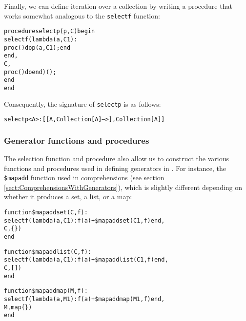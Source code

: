 

Finally, we can define iteration over a collection by writing a
procedure that works somewhat analogous to the {\tt selectf} function:

\begin{alltt}procedure selectp(p, C) begin
    selectf(lambda (a, C1) : 
                proc () do p(a, C1); end 
            end, 
            C,
            proc () do end)();
    end 
end
\end{alltt}

Consequently, the signature of {\tt selectp} is as follows:

\begin{alltt}  selectp<A>: [[A, Collection[A] -->], Collection[A]]\end{alltt}

\subsubsection{Generator functions and procedures}


The selection function and procedure also allow us to construct the
various functions and procedures used in defining generators in
\Cal. For instance, the {\tt \$mapadd} function used in comprehensions
(see section \ref{sect:ComprehensionsWithGenerators}), which is slightly
different depending on whether it produces a set, a list, or a map:

\begin{alltt}function \$mapaddset (C, f) :
    selectf(lambda (a, C1) : f(a) + \$mapaddset(C1, f) end, 
            C, \{\})
end

function \$mapaddlist (C, f) :
    selectf(lambda (a, C1) : f(a) + \$mapaddlist(C1, f) end, 
            C, [])
end

function \$mapaddmap (M, f) :
    selectf(lambda (a, M1) : f(a) + \$mapaddmap(M1, f) end, 
            M, map \{\})
end\end{alltt}


